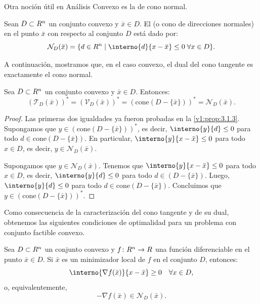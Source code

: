 Otra noción útil en Análisis Convexo es la de cono normal.

\begin{definition}\label{v1:def:3.1.3}
 Sean $D \subset R^n$ un conjunto convexo y $\bar{x} \in D$. El  (o cono de direcciones normales) en el punto $\bar{x}$ con respecto al conjunto $D$ está dado por:
 \[
 \mathcal{N}_D(\bar{x}) = \{d \in \Rn \mid \interno{d}{x - \bar{x}} \leq 0 \; \forall x \in D\}.
 \]
\end{definition}

A continuación, mostramos que, en el caso convexo, el dual del cono tangente es exactamente el cono normal.

\begin{theorem}\label{v1:thm:3.1.2}
 Sea $D \subset R^n$ un conjunto convexo y $\bar{x} \in D$. Entonces:
 \[
 (\mathcal{T}_D(\bar{x}))^* = (\mathcal{V}_D(\bar{x}))^* = (\text{cone}(D - \{\bar{x}\}))^* = \mathcal{N}_D(\bar{x}).
 \]
\end{theorem}

\begin{proof}
 Las primeras dos igualdades ya fueron probadas en la \cref{v1:prop:3.1.3}. Supongamos que $y \in (\text{cone}(D - \{\bar{x}\}))^*$, es decir, $\interno{y}{d} \leq 0$ para todo $d \in \text{cone}(D - \{\bar{x}\})$. En particular, $\interno{y}{x - \bar{x}} \leq 0$ para todo $x \in D$, es decir, $y \in \mathcal{N}_D(\bar{x})$.
 
 Supongamos que $y \in \mathcal{N}_D(\bar{x})$. Tenemos que $\interno{y}{x - \bar{x}} \leq 0$ para todo $x \in D$, es decir, $\interno{y}{d} \leq 0$ para todo $d \in (D - \{\bar{x}\})$. Luego, $\interno{y}{d} \leq 0$ para todo $d \in \text{cone}(D - \{\bar{x}\})$. Concluimos que $y \in (\text{cone}(D - \{\bar{x}\}))^*$.
\end{proof}

Como consecuencia de la caracterización del cono tangente y de su dual, obtenemos las siguientes condiciones de optimalidad para un problema con conjunto factible convexo.

\begin{theorem}\label{v1:thm:3.1.3}
 Sea $D \subset R^n$ un conjunto convexo y $f \colon R^n \to R$ una función diferenciable en el punto $\bar{x} \in D$. Si $\bar{x}$ es un minimizador local de $f$ en el conjunto $D$, entonces:
 \begin{equation}
 \interno{\nabla f(\bar{x})}{x - \bar{x}} \geq 0 \quad \forall x \in D, \label{v1:eq:3.2}
 \end{equation}
 o, equivalentemente,
 \begin{equation}
 -\nabla f(\bar{x}) \in \mathcal{N}_D(\bar{x}). \label{v1:eq:3.3}
 \end{equation}
\end{theorem}

